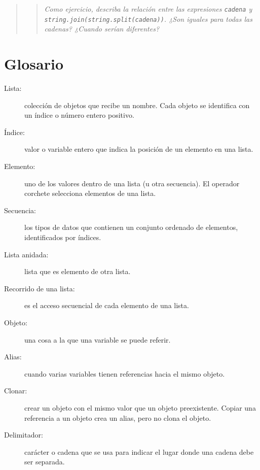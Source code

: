 \begin{quote}
\begin{quote}
{\em Como ejercicio, describa la relación entre las expresiones \texttt{cadena} 
y {\tt string.join(string.split(cadena))}. ¿Son iguales
para todas las cadenas? ¿Cuando serían diferentes?}
\end{quote}
\end{quote}


\section{Glosario}

\begin{description}

\item[Lista:] colección de objetos que recibe un nombre. Cada objeto se
identifica con un índice o número entero positivo.

\item[Índice:] valor o variable entero que indica la posición de un elemento en una lista.

\item[Elemento:] uno de los valores dentro de una lista (u otra secuencia).  El 
operador corchete selecciona elementos de una lista.

\item[Secuencia:] los tipos de datos que contienen un conjunto ordenado de
elementos, identificados por índices.

\item[Lista anidada:] lista que es elemento de otra lista.

\item[Recorrido de una lista:] es el acceso secuencial de cada elemento de una lista.

\item[Objeto:] una cosa a la que una variable se puede referir.

\item[Alias:] cuando varias variables tienen referencias hacia el mismo objeto.

\item[Clonar:] crear un objeto con el mismo valor que un objeto preexistente.
Copiar una referencia a un objeto crea un alias, pero no clona el objeto.

\item[Delimitador:] carácter o cadena que se usa para indicar el lugar donde una cadena debe ser separada.


\end{description}
